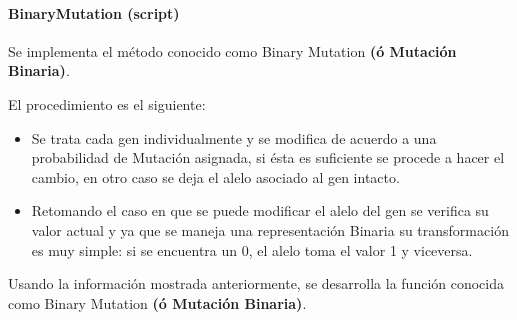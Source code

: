 \documentclass[letterpaper,10pt,english]{sphinxmanual}
\begin{document}
\paragraph{BinaryMutation (script)}
\label{Model/Operator/Mutation/BinaryMutation:binarymutation-script}\label{Model/Operator/Mutation/BinaryMutation::doc}
\begin{DUlineblock}{0em}
\item[] Se implementa el método conocido como Binary Mutation \textbf{(ó Mutación Binaria)}.
\item[] El procedimiento es el siguiente:
\end{DUlineblock}
\begin{itemize}
\item {} 
Se trata cada gen individualmente y se modifica de acuerdo a una probabilidad de Mutación asignada, si ésta es suficiente se procede a hacer el cambio, en otro caso se deja el alelo asociado al gen intacto.

\item {} 
Retomando el caso en que se puede modificar el alelo del gen se verifica su valor actual y ya que se maneja una representación Binaria su transformación es muy simple: si se encuentra un 0, el alelo toma el valor 1 y viceversa.

\end{itemize}
\label{Model/Operator/Mutation/BinaryMutation:module-Model.Operator.Mutation.BinaryMutation}

\begin{fulllineitems}
\label{Model/Operator/Mutation/BinaryMutation:Model.Operator.Mutation.BinaryMutation.execute_mutation_technique}
Usando la información mostrada anteriormente, se desarrolla la función
conocida como Binary Mutation \textbf{(ó Mutación Binaria)}.

\end{fulllineitems}
\end{document}
